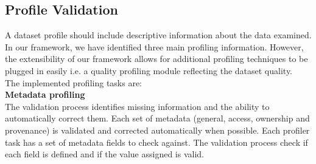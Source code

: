 \documentclass[runningheads,a4paper]{llncs}
\begin{document}


\subsection{Profile Validation}

A dataset profile should include descriptive information about the data examined. In our framework, we have identified three main profiling information. However, the extensibility of our framework allows for additional profiling techniques to be plugged in easily i.e. a quality profiling module reflecting the dataset quality.\\
The implemented profiling tasks are:\\

\textbf{Metadata profiling}\\

The validation process identifies missing information and the ability to automatically correct them. Each set of metadata (general, access, ownership and provenance) is validated and corrected automatically when possible. Each profiler task has a set of metadata fields to check against. The validation process check if each field is defined and if the value assigned is valid.
\end{document}
